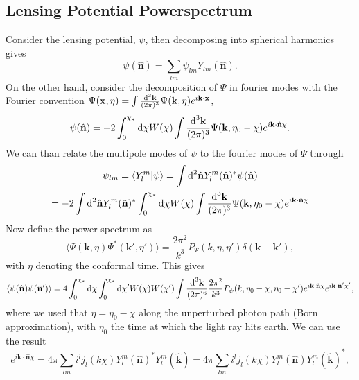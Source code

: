 \documentclass[11pt]{article} %
\DeclareRobustCommand{\d}{\ifmmode\text{d}\else d\fi}
\begin{document}
\subsection{Lensing Potential Powerspectrum}
Consider the lensing potential, $\psi$, then decomposing into spherical harmonics gives
\begin{equation}
    \psi(\hat{\mathbf n}) = \sum_{lm} \psi_{lm}Y_{lm}(\hat{\mathbf n}).
\end{equation}
On the other hand, consider the decomposition of $\Psi$ in fourier modes with the Fourier convention $\Psi(\mathbf x, \eta)=\int\frac{\d^3 \mathbf k}{(2\pi)^{3}}\Psi(\mathbf k, \eta)e^{i\mathbf k \cdot\mathbf x}$,
\begin{equation}
    \psi(\hat{\mathbf n}) = -2 \int_0^{\chi_*}\d \chi W(\chi) \int\frac{\d^3 \mathbf k}{(2\pi)^{3}}\Psi(\mathbf k, \eta_0 - \chi)e^{i\mathbf k \cdot\hat{\mathbf n}\chi}.
\end{equation}
We can than relate the multipole modes of $\psi$ to the fourier modes of $\Psi$ through %
\begin{gather}
    \psi_{lm} = \langle Y_l^m | \psi \rangle = \int\d^2\hat{\mathbf n} Y_l^m(\hat{\mathbf n})^* \psi(\hat{\mathbf n})\\ 
    = -2\int\d^2\hat{\mathbf n} Y_l^m(\hat{\mathbf n})^* \int_0^{\chi_*}\d \chi W(\chi) \int\frac{\d^3 \mathbf k}{(2\pi)^{3}}\Psi(\mathbf k, \eta_0 - \chi)e^{i\mathbf k \cdot\hat{\mathbf n}\chi}
\end{gather}
Now define the power spectrum as
\begin{equation}
    \langle \Psi(\mathbf k, \eta)\Psi^*(\mathbf k',\eta')\rangle = \frac{2\pi^2}{k^3}P_\Psi(k, \eta, \eta')\delta(\mathbf k - \mathbf k'),
\end{equation}
with $\eta$ denoting the conformal time. This gives 
\begin{equation}
    \langle \psi(\hat{\mathbf n})\psi(\hat{\mathbf n}') \rangle = 4\int_0^{\chi_*}\d \chi\int_0^{\chi_*}\d \chi' W(\chi)W(\chi')\int \frac{\d^3\mathbf k}{(2\pi)^6}\frac{2\pi^2}{k^3}P_\psi(k,\eta_0 - \chi, \eta_0-\chi')e^{i\mathbf k\cdot\hat {\mathbf n}\chi}e^{i\mathbf k\cdot\hat {\mathbf n}'\chi'},
\end{equation}
where we used that $\eta = \eta_0 - \chi$ along the unperturbed photon path (Born approximation), with $\eta_0$ the time at which the light ray hits earth. 
We can use the result
\begin{equation}
    e^{i\mathbf k \cdot \hat {\mathbf n}\chi}=4\pi\sum_{lm}i^lj_l(k\chi )Y_l^m(\hat{\mathbf n})^*Y_l^m(\hat{\mathbf k}) = 4\pi\sum_{lm}i^lj_l(k\chi )Y_l^m(\hat{\mathbf n})Y_l^m(\hat{\mathbf k})^*,
\end{equation}
\end{document}
